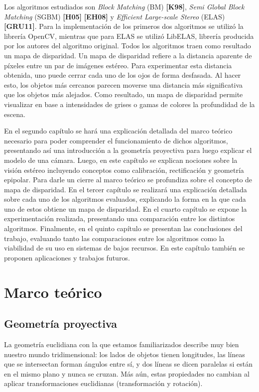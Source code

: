 \documentclass[11pt,a4paper,titlepage]{article}
\newcommand{\Cite}[1]{\textbf{[#1]}}
\begin{document}
Los algoritmos estudiados son \textit{Block Matching} (BM) \Cite{K98}, \textit{Semi Global Block Matching} (SGBM) \Cite{H05} \Cite{EH08} y \textit{Efficient Large-scale Stereo} (ELAS) \Cite{GRU11}. Para la implementación de los primeros dos algoritmos se utilizó la librería OpenCV, mientras que para ELAS se utilizó LibELAS, librería producida por los autores del algoritmo original. Todos los algoritmos traen como resultado un mapa de disparidad. Un mapa de disparidad refiere a la distancia aparente de píxeles entre un par de imágenes estéreo. Para experimentar esta distancia obtenida, uno puede cerrar cada uno de los ojos de forma desfasada. Al hacer esto, los objetos más cercanos parecen moverse una distancia más significativa que los objetos más alejados. Como resultado, un mapa de disparidad permite visualizar en base a intensidades de grises o gamas de colores la profundidad de la escena. 

En el segundo capítulo se hará una explicación detallada del marco teórico necesario para poder comprender el funcionamiento de dichos algoritmos, presentando así una introducción a la geometría proyectiva para luego explicar el modelo de una cámara. Luego, en este capítulo se explican nociones sobre la visión estéreo incluyendo conceptos como calibración, rectificación y geometría epipolar. Para darle un cierre al marco teórico se profundiza sobre el concepto de mapa de disparidad. En el tercer capítulo se realizará una explicación detallada sobre cada uno de los algoritmos evaluados, explicando la forma en la que cada uno de estos obtiene un mapa de disparidad. En el cuarto capítulo se expone la experimentación realizada, presentando una comparación entre los distintos algoritmos. Finalmente, en el quinto capítulo se presentan las conclusiones del trabajo, evaluando tanto las comparaciones entre los algoritmos como la viabilidad de su uso en sistemas de bajos recursos. En este capítulo también se proponen aplicaciones y trabajos futuros.

\newpage

\section{Marco teórico}

\subsection{Geometría proyectiva}

La geometría euclidiana con la que estamos familiarizados describe muy bien nuestro mundo tridimensional: los lados de objetos tienen longitudes, las líneas que se intersectan forman ángulos entre sí, y dos líneas se dicen paralelas si están en el mismo plano y nunca se cruzan. Más aún, estas propiedades no cambian al aplicar transformaciones euclidianas (transformación y rotación).
\end{document}
